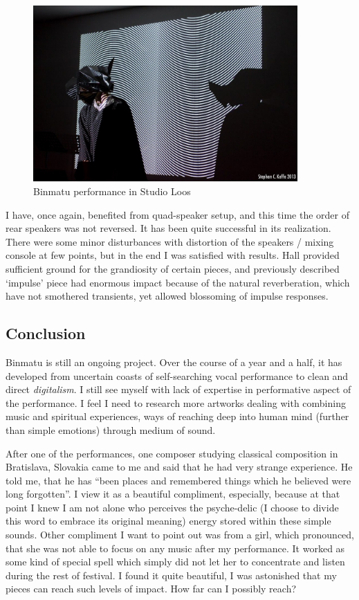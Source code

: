 \documentclass[12pt,a4paper,oneside]{report}
\begin{document}
\begin{figure}  
  \centering
    \includegraphics[width=0.9\textwidth]{img/binmatu_perfo}
	\caption{Binmatu performance in Studio Loos}
	\label{fig:binmatu_perfo}
\end{figure}

I have, once again, benefited from quad-speaker setup, and this time the order of rear speakers was not reversed. It has been quite successful in its realization. There were some minor disturbances with distortion of the speakers / mixing console at few points, but in the end I was satisfied with results. Hall provided sufficient ground for the grandiosity of certain pieces, and previously described `impulse' piece had enormous impact because of the natural reverberation, which have not smothered transients, yet allowed blossoming of impulse responses.

\subsection{Conclusion}

Binmatu is still an ongoing project. Over the course of a year and a half, it has developed from uncertain coasts of self-searching vocal performance to clean and direct \emph{digitalism}. I still see myself with lack of expertise in performative aspect of the performance. I feel I need to research more artworks dealing with combining music and spiritual experiences, ways of reaching deep into human mind (further than simple emotions) through medium of sound. 

After one of the performances, one composer studying classical composition in Bratislava, Slovakia came to me and said that he had very strange experience. He told me, that he has ``been places and remembered things which he believed were long forgotten''. I view it as a beautiful compliment, especially, because at that point I knew I am not alone who perceives the psyche-delic (I choose to divide this word to embrace its original meaning) energy stored within these simple sounds. Other compliment I want to point out was from a girl, which pronounced, that she was not able to focus on any music after my performance. It worked as some kind of special spell which simply did not let her to concentrate and listen during the rest of festival. I found it quite beautiful, I was astonished that my pieces can reach such levels of impact. How far can I possibly reach?
\end{document}
